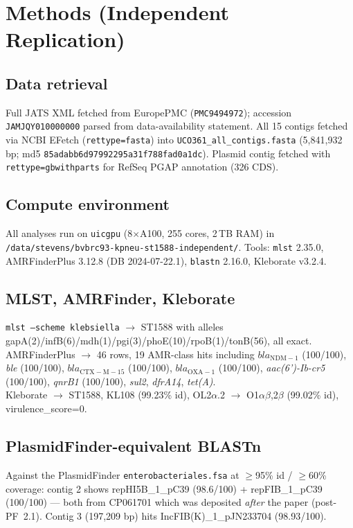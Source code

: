 \documentclass[11pt,letterpaper]{article}
\begin{document}
\section{Methods (Independent Replication)}
\subsection{Data retrieval}
Full JATS XML fetched from EuropePMC (\texttt{PMC9494972}); accession \texttt{JAMJQY010000000} parsed
from data-availability statement. All 15 contigs fetched via NCBI EFetch (\texttt{rettype=fasta}) into
\texttt{UCO361\_all\_contigs.fasta} (5{,}841{,}932 bp; md5 \texttt{85adabb6d97992295a31f788fad0a1dc}).
Plasmid contig fetched with \texttt{rettype=gbwithparts} for RefSeq PGAP annotation (326 CDS).

\subsection{Compute environment}
All analyses run on \texttt{uicgpu} (8$\times$A100, 255 cores, 2\,TB RAM) in
\texttt{/data/stevens/bvbrc93-kpneu-st1588-independent/}. Tools:
\texttt{mlst} 2.35.0, AMRFinderPlus 3.12.8 (DB 2024-07-22.1), \texttt{blastn} 2.16.0,
Kleborate v3.2.4.

\subsection{MLST, AMRFinder, Kleborate}
\texttt{mlst --scheme klebsiella} $\to$ ST1588 with alleles gapA(2)/infB(6)/mdh(1)/pgi(3)/phoE(10)/rpoB(1)/tonB(56), all exact.\\
AMRFinderPlus $\to$ 46 rows, 19 AMR-class hits including $bla_{\mathrm{NDM-1}}$ (100/100), \textit{ble} (100/100), $bla_{\mathrm{CTX-M-15}}$ (100/100), $bla_{\mathrm{OXA-1}}$ (100/100), \textit{aac(6')-Ib-cr5} (100/100), \textit{qnrB1} (100/100), \textit{sul2}, \textit{dfrA14}, \textit{tet(A)}.\\
Kleborate $\to$ ST1588, KL108 (99.23\% id), OL2$\alpha$.2 $\to$ O1$\alpha\beta$,2$\beta$ (99.02\% id), virulence\_score=0.

\subsection{PlasmidFinder-equivalent BLASTn}
Against the PlasmidFinder \texttt{enterobacteriales.fsa} at $\geq$95\% id / $\geq$60\% coverage:
contig 2 shows repHI5B\_1\_pC39 (98.6/100) + repFIB\_1\_pC39 (100/100) --- both from CP061701 which
was deposited \emph{after} the paper (post-PF~2.1). Contig 3 (197{,}209 bp) hits IncFIB(K)\_1\_pJN233704
(98.93/100).
\end{document}
